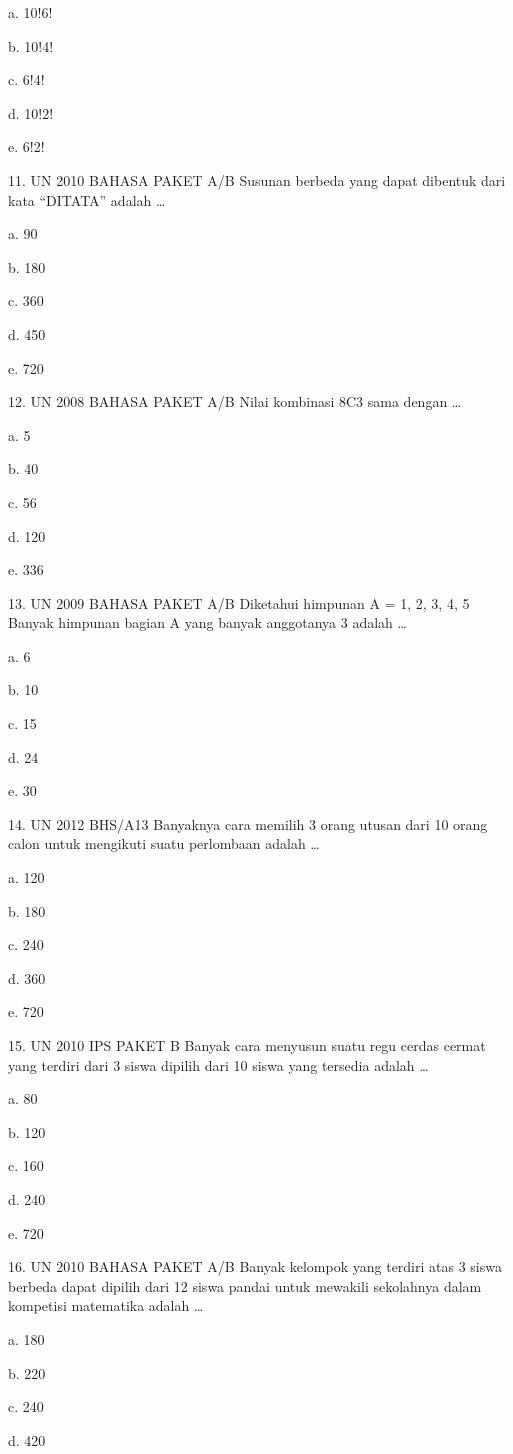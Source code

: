 \documentclass[11pt,fleqn]{book} %
\begin{document}
a.	10!6!

b.	10!4!

c.	6!4!

d.	10!2!

e.	6!2!

11.	UN 2010 BAHASA PAKET A/B 
Susunan berbeda yang dapat dibentuk dari kata “DITATA” adalah …

a.	90

b.	180

c.	360

d.	450

e.	720

12.	UN 2008 BAHASA PAKET A/B 
Nilai kombinasi 8C3 sama dengan …

a.	5

b.	40

c.	56

d.	120

e.	336

13.	UN 2009 BAHASA PAKET A/B 
Diketahui himpunan A = {1, 2, 3, 4, 5} Banyak himpunan bagian A yang banyak anggotanya 3 adalah …

a.	6

b.	10

c.	15

d.	24

e.	30

14.	UN 2012 BHS/A13 
Banyaknya cara memilih 3 orang utusan dari 10 orang calon untuk mengikuti suatu perlombaan adalah …

a.	120

b.	180

c.	240

d.	360

e.	720

15.	UN 2010 IPS PAKET B 
Banyak cara menyusun suatu regu cerdas cermat yang terdiri dari 3 siswa dipilih dari 10 siswa yang tersedia adalah …

a.	80

b.	120

c.	160

d.	240

e.	720

16.	UN 2010 BAHASA PAKET A/B 
Banyak kelompok yang terdiri atas 3 siswa berbeda dapat dipilih dari 12 siswa pandai untuk mewakili sekolahnya dalam kompetisi matematika adalah …

a.	180

b.	220

c.	240

d.	420
\end{document}
